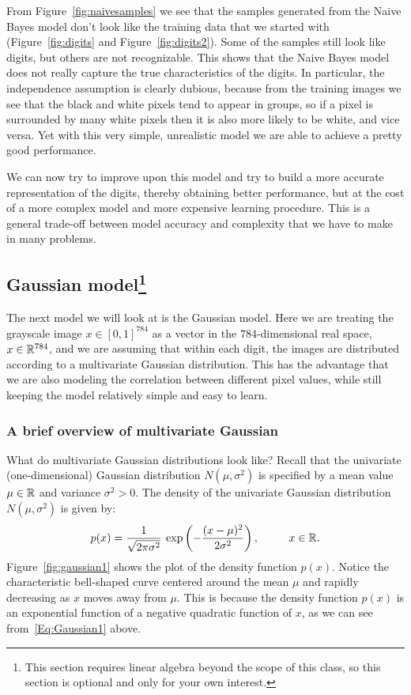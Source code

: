 \documentclass[11pt]{article}
\begin{document}
From Figure~\ref{fig:naivesamples} we see that the samples generated from the Naive Bayes model don't look like the training data that we started with (Figure~\ref{fig:digits} and Figure~\ref{fig:digits2}). Some of the samples still look like digits, but others are not recognizable. This shows that the Naive Bayes model does not really capture the true characteristics of the digits. In particular, the independence assumption is clearly dubious, because from the training images we see that the black and white pixels tend to appear in groups, so if a pixel is surrounded by many white pixels then it is also more likely to be white, and vice versa. Yet with this very simple, unrealistic model we are able to achieve a pretty good performance.

We can now try to improve upon this model and try to build a more accurate representation of the digits, thereby obtaining better performance, but at the cost of a more complex model and more expensive learning procedure. This is a general trade-off between model accuracy and complexity that we have to make in many problems.



\subsection*{Gaussian model\footnote{This section requires linear algebra beyond the scope of this class, so this section is optional and only for your own interest.}}

The next model we will look at is the Gaussian model. Here we are treating the grayscale image $x \in [0,1]^{784}$ as a vector in the $784$-dimensional real space, $x \in \mathbb{R}^{784}$, and we are assuming that within each digit, the images are distributed according to a multivariate Gaussian distribution. This has the advantage that we are also modeling the correlation between different pixel values, while still keeping the model relatively simple and easy to learn.


\subsubsection*{A brief overview of multivariate Gaussian}

What do multivariate Gaussian distributions look like? Recall that the univariate (one-dimensional) Gaussian distribution $N(\mu,\sigma^2)$ is specified by a mean value $\mu \in \mathbb{R}$ and variance $\sigma^2 > 0$. The density of the univariate Gaussian distribution $N(\mu,\sigma^2)$ is given by:
\begin{align}\label{Eq:Gaussian1}
p(x) = \frac{1}{\sqrt{2\pi \sigma^2}} \: \exp\left(-\frac{(x-\mu)^2}{2\sigma^2} \right), ~~~~~~~~ x \in \mathbb{R}.
\end{align}
Figure~\ref{fig:gaussian1} shows the plot of the density function $p(x)$. Notice the characteristic bell-shaped curve centered around the mean $\mu$ and rapidly decreasing as $x$ moves away from $\mu$. This is because the density function $p(x)$ is an exponential function of a negative quadratic function of $x$, as we can see from~\eqref{Eq:Gaussian1} above.
\end{document}
